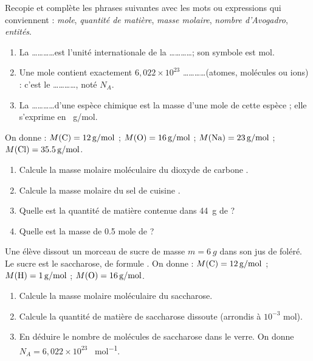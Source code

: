 \documentclass[11pt]{article}
\newcounter{popsec}
\newcounter{popsub}
\newcommand{\courssub}[1]{%
  \stepcounter{popsub}%
  \par\vspace{9pt}\noindent{\popxbold\fontsize{11.5}{13}\selectfont\color{popink}{\color{poporange}\thepopsec.\thepopsub}\hspace{6pt}#1}\par\nopagebreak\vspace{4pt}
}
\begin{document}
\begin{exercice}
Recopie et complète les phrases suivantes avec les mots ou expressions qui conviennent : \emph{mole}, \emph{quantité de matière}, \emph{masse molaire}, \emph{nombre d'Avogadro}, \emph{entités}.
\begin{enumerate}
\item La \ldots\ldots\ldots\ldots est l'unité internationale de la \ldots\ldots\ldots\ldots ; son symbole est mol.
\item Une mole contient exactement $6,022\times 10^{23}$ \ldots\ldots\ldots\ldots (atomes, molécules ou ions) : c'est le \ldots\ldots\ldots\ldots, noté $N_A$.
\item La \ldots\ldots\ldots\ldots d'une espèce chimique est la masse d'une mole de cette espèce ; elle s'exprime en \SI{}{g/mol}.
\end{enumerate}
\end{exercice}

\begin{exercice}
On donne : $M(\ce{C}) = \SI{12}{g/mol}$ ; $M(\ce{O}) = \SI{16}{g/mol}$ ; $M(\ce{Na}) = \SI{23}{g/mol}$ ; $M(\ce{Cl}) = \SI{35,5}{g/mol}$.
\begin{enumerate}
\item Calcule la masse molaire moléculaire du dioxyde de carbone .
\item Calcule la masse molaire du sel de cuisine .
\item Quelle est la quantité de matière contenue dans \SI{44}{g} de  ?
\item Quelle est la masse de \num{0,5} mole de  ?
\end{enumerate}
\end{exercice}

\courssub{Je m'entraîne}

\begin{exercice}
Une élève dissout un morceau de sucre de masse $m = \SI{6}{g}$ dans son jus de foléré. Le sucre est le saccharose, de formule .
On donne : $M(\ce{C}) = \SI{12}{g/mol}$ ; $M(\ce{H}) = \SI{1}{g/mol}$ ; $M(\ce{O}) = \SI{16}{g/mol}$.
\begin{enumerate}
\item Calcule la masse molaire moléculaire du saccharose.
\item Calcule la quantité de matière de saccharose dissoute (arrondis à $10^{-3}$ mol).
\item En déduire le nombre de molécules de saccharose dans le verre. On donne $N_A = 6,022\times 10^{23}$ \SI{}{mol^{-1}}.
\end{enumerate}
\end{exercice}
\end{document}
